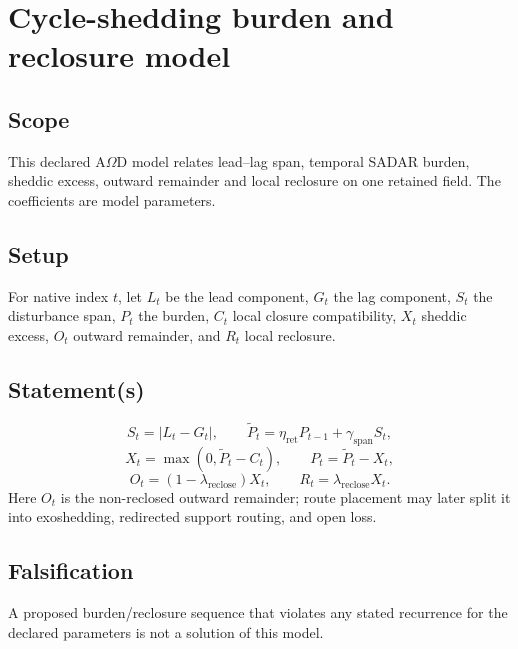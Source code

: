 \section{Cycle-shedding burden and reclosure model}
\label{app:cycle-shedding-demonstration}

\subsection{Scope}
\label{app:cycle-shedding-demo-scope}
This declared A\(\Omega\)D model relates lead--lag span, temporal SADAR
burden, sheddic excess, outward remainder and local reclosure on one retained
field. The coefficients are model parameters.

\subsection{Setup}
\label{app:cycle-shedding-demo-setup}
For native index \(t\), let \(L_t\) be the lead component, \(G_t\) the lag component, \(S_t\) the disturbance span, \(P_t\) the burden, \(C_t\) local closure compatibility, \(X_t\) sheddic excess, \(O_t\) outward remainder, and \(R_t\) local reclosure.

\subsection{Statement(s)}
\label{app:cycle-shedding-demo-statements}
\[
S_t=|L_t-G_t|,
\qquad
\widetilde P_t=\eta_{\mathrm{ret}} P_{t-1}+\gamma_{\mathrm{span}} S_t,
\]
\[
X_t=\max(0,\widetilde P_t-C_t),
\qquad
P_t=\widetilde P_t-X_t,
\]
\[
O_t=(1-\lambda_{\mathrm{reclose}})X_t,
\qquad
R_t=\lambda_{\mathrm{reclose}}X_t.
\]
Here \(O_t\) is the non-reclosed outward remainder; route placement may later split it into exoshedding, redirected support routing, and open loss.

\subsection{Falsification}
\label{app:cycle-shedding-demo-falsification}
A proposed burden/reclosure sequence that violates any stated recurrence
for the declared parameters is not a solution of this model.

